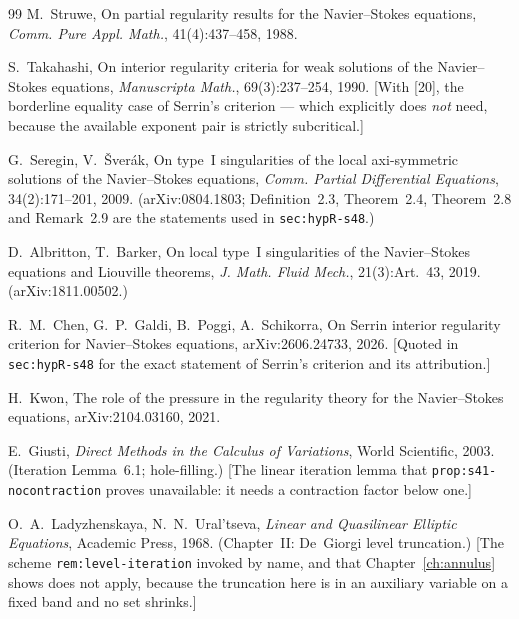 \begin{thebibliography}{99}
  M.~Struwe,
  On partial regularity results for the Navier--Stokes equations,
  \emph{Comm. Pure Appl. Math.}, 41(4):437--458, 1988.

  S.~Takahashi,
  On interior regularity criteria for weak solutions of the Navier--Stokes
  equations,
  \emph{Manuscripta Math.}, 69(3):237--254, 1990.
  \textsf{[With [20], the borderline equality case of Serrin's criterion ---
  which  explicitly does \emph{not} need, because the available
  exponent pair is strictly subcritical.]}

  G.~Seregin, V.~\v{S}ver\'ak,
  On type~I singularities of the local axi-symmetric solutions of the
  Navier--Stokes equations,
  \emph{Comm. Partial Differential Equations}, 34(2):171--201, 2009.
  (arXiv:0804.1803; Definition~2.3, Theorem~2.4, Theorem~2.8 and Remark~2.9
  are the statements used in \texttt{sec:hypR-s48}.)

  D.~Albritton, T.~Barker,
  On local type~I singularities of the Navier--Stokes equations and Liouville
  theorems,
  \emph{J. Math. Fluid Mech.}, 21(3):Art.~43, 2019. (arXiv:1811.00502.)

  R.~M.~Chen, G.~P.~Galdi, B.~Poggi, A.~Schikorra,
  On Serrin interior regularity criterion for Navier--Stokes equations,
  arXiv:2606.24733, 2026.
  \textsf{[Quoted in \texttt{sec:hypR-s48} for the exact statement of
  Serrin's criterion and its attribution.]}

  H.~Kwon,
  The role of the pressure in the regularity theory for the Navier--Stokes
  equations,
  arXiv:2104.03160, 2021.

  E.~Giusti,
  \emph{Direct Methods in the Calculus of Variations},
  World Scientific, 2003. (Iteration Lemma~6.1; hole-filling.)
  \textsf{[The linear iteration lemma that \texttt{prop:s41-nocontraction}
  proves unavailable: it needs a contraction factor below one.]}

  O.~A.~Ladyzhenskaya, N.~N.~Ural'tseva,
  \emph{Linear and Quasilinear Elliptic Equations},
  Academic Press, 1968. (Chapter~II: De~Giorgi level truncation.)
  \textsf{[The scheme \texttt{rem:level-iteration} invoked by name, and that
  Chapter~\ref{ch:annulus} shows does not apply, because the truncation here
  is in an auxiliary variable on a fixed band and no set shrinks.]}



\end{thebibliography}
